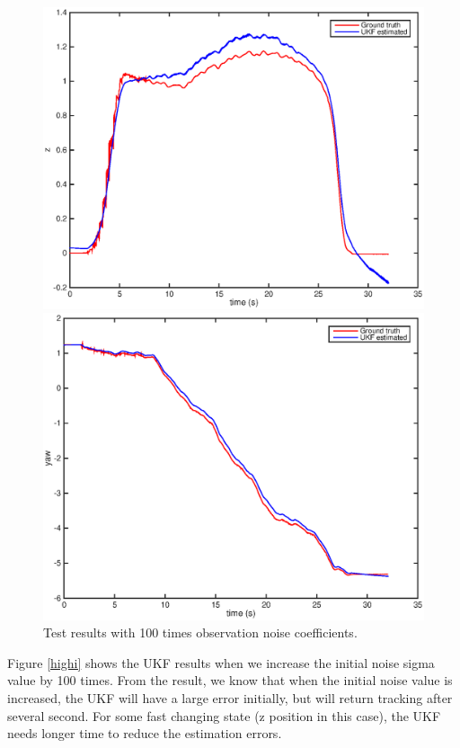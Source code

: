 \documentclass[letter, 10pt]{article}
\begin{document}
\begin{onehalfspacing}
\begin{figure}[h]
\begin{minipage}{.25\textwidth}
    		\includegraphics[width=1\linewidth]{r_z.eps}
	\end{minipage}%
	\begin{minipage}{.25\textwidth}  
		\centering
    		\includegraphics[width=1\linewidth]{r_yaw.eps}
	\end{minipage}
	\centering
	\caption{Test results with 100 times observation noise coefficients.}
	\label{highr}
\end{figure}

Figure \ref{highi} shows the UKF results when we increase the initial noise sigma value by 100 times. From the result, we know that when the initial noise value is increased, the UKF will have a large error initially, but will return tracking after several second. For some fast changing state (z position in this case), the UKF needs longer time to reduce the estimation errors. 


\end{onehalfspacing}
\end{document}

